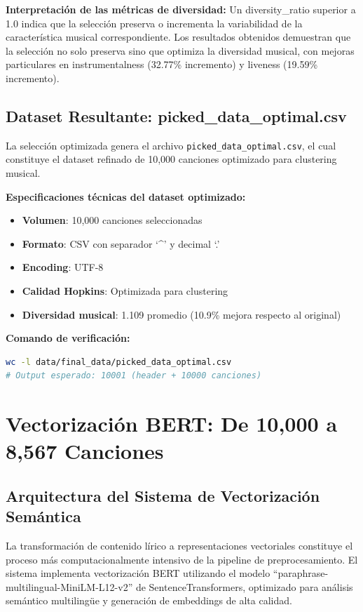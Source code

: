 \documentclass[12pt,a4paper]{article}
\begin{document}
\textbf{Interpretación de las métricas de diversidad:}
Un diversity\_ratio superior a 1.0 indica que la selección preserva o incrementa la variabilidad de la característica musical correspondiente. Los resultados obtenidos demuestran que la selección no solo preserva sino que optimiza la diversidad musical, con mejoras particulares en instrumentalness (32.77\% incremento) y liveness (19.59\% incremento).

\subsection{Dataset Resultante: picked\_data\_optimal.csv}

La selección optimizada genera el archivo \texttt{picked\_data\_optimal.csv}, el cual constituye el dataset refinado de 10,000 canciones optimizado para clustering musical.

\textbf{Especificaciones técnicas del dataset optimizado:}
\begin{itemize}[leftmargin=*]
    \item \textbf{Volumen}: 10,000 canciones seleccionadas
    \item \textbf{Formato}: CSV con separador `\^{}' y decimal `.'
    \item \textbf{Encoding}: UTF-8
    \item \textbf{Calidad Hopkins}: Optimizada para clustering
    \item \textbf{Diversidad musical}: 1.109 promedio (10.9\% mejora respecto al original)
\end{itemize}

\textbf{Comando de verificación:}
\begin{lstlisting}[language=bash]
wc -l data/final_data/picked_data_optimal.csv
# Output esperado: 10001 (header + 10000 canciones)
\end{lstlisting}

\section{Vectorización BERT: De 10,000 a 8,567 Canciones}

\subsection{Arquitectura del Sistema de Vectorización Semántica}

La transformación de contenido lírico a representaciones vectoriales constituye el proceso más computacionalmente intensivo de la pipeline de preprocesamiento. El sistema implementa vectorización BERT utilizando el modelo ``paraphrase-multilingual-MiniLM-L12-v2'' de SentenceTransformers, optimizado para análisis semántico multilingüe y generación de embeddings de alta calidad.
\end{document}
